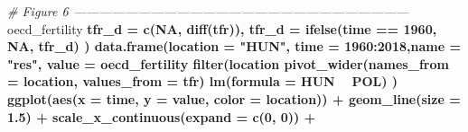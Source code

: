 \documentclass[
]{article}
\newenvironment{Shaded}{\begin{snugshade}}{\end{snugshade}}
\newcommand{\CommentTok}[1]{\textcolor[rgb]{0.56,0.35,0.01}{\textit{#1}}}
\newcommand{\DataTypeTok}[1]{\textcolor[rgb]{0.13,0.29,0.53}{#1}}
\newcommand{\DecValTok}[1]{\textcolor[rgb]{0.00,0.00,0.81}{#1}}
\newcommand{\FloatTok}[1]{\textcolor[rgb]{0.00,0.00,0.81}{#1}}
\newcommand{\KeywordTok}[1]{\textcolor[rgb]{0.13,0.29,0.53}{\textbf{#1}}}
\newcommand{\NormalTok}[1]{#1}
\newcommand{\OperatorTok}[1]{\textcolor[rgb]{0.81,0.36,0.00}{\textbf{#1}}}
\newcommand{\OtherTok}[1]{\textcolor[rgb]{0.56,0.35,0.01}{#1}}
\newcommand{\StringTok}[1]{\textcolor[rgb]{0.31,0.60,0.02}{#1}}
\begin{document}
\begin{Shaded}
\begin{Highlighting}[numbers=left,,]
{{{{{{{{{{{{{{{{{{{{{{{{{{{{{{{{{{{{{{{{{{{{{{{{{{{{{{{{{{{{{{\CommentTok{# Figure 6 ------------------------------------------------------------------------------}
\NormalTok{oecd_fertility }\OperatorTok{%
  \DataTypeTok{tfr_d =} \KeywordTok{c}\NormalTok{(}\OtherTok{NA}\NormalTok{, }\KeywordTok{diff}\NormalTok{(tfr)),}
  \DataTypeTok{tfr_d =} \KeywordTok{ifelse}\NormalTok{(time }\OperatorTok{==}\StringTok{ }\DecValTok{1960}\NormalTok{, }\OtherTok{NA}\NormalTok{, tfr_d)}
\NormalTok{) }\OperatorTok{%
  \KeywordTok{data.frame}\NormalTok{(}\DataTypeTok{location =} \StringTok{"HUN"}\NormalTok{, }\DataTypeTok{time =} \DecValTok{1960}\OperatorTok{:}\DecValTok{2018}\NormalTok{,}\DataTypeTok{name =} \StringTok{"res"}\NormalTok{, }\DataTypeTok{value =}\NormalTok{ oecd_fertility }\OperatorTok{%
\StringTok{               }\KeywordTok{filter}\NormalTok{(location }\OperatorTok{%
\StringTok{               }\KeywordTok{pivot_wider}\NormalTok{(}\DataTypeTok{names_from =}\NormalTok{ location, }\DataTypeTok{values_from =}\NormalTok{ tfr) }\OperatorTok{%
\StringTok{               }\KeywordTok{lm}\NormalTok{(}\DataTypeTok{formula =}\NormalTok{ HUN }\OperatorTok{~}\StringTok{ }\NormalTok{POL) }\OperatorTok{%
\NormalTok{) }\OperatorTok{%
\StringTok{  }\KeywordTok{ggplot}\NormalTok{(}\KeywordTok{aes}\NormalTok{(}\DataTypeTok{x =}\NormalTok{ time, }\DataTypeTok{y =}\NormalTok{ value, }\DataTypeTok{color =}\NormalTok{ location)) }\OperatorTok{+}\StringTok{ }\KeywordTok{geom_line}\NormalTok{(}\DataTypeTok{size =} \FloatTok{1.5}\NormalTok{) }\OperatorTok{+}
\StringTok{  }\KeywordTok{scale_x_continuous}\NormalTok{(}\DataTypeTok{expand =} \KeywordTok{c}\NormalTok{(}\DecValTok{0}\NormalTok{, }\DecValTok{0}\NormalTok{)) }\OperatorTok{+}
}}}}}}}}}}}}}}}}}}}}}}}}}}}}}}}}}}}}}}}}}}}}}}}}}}}}}}}}}}}}}}}}}}}}}
\end{Highlighting}
\end{Shaded}
\end{document}
